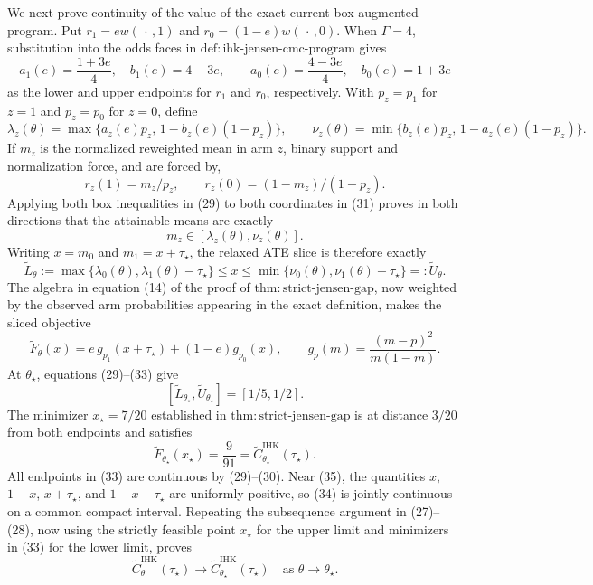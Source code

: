 We next prove continuity of the value of the exact current box-augmented program.  Put \(r_1=ew(\,\cdot\,,1)\) and \(r_0=(1-e)w(\,\cdot\,,0)\).  When \(\Gamma=4\), substitution into the odds faces in \(\mathrm{def{:}ihk\mbox{-}jensen\mbox{-}cmc\mbox{-}program}\) gives
\[
a_1(e)=\frac{1+3e}{4},\quad b_1(e)=4-3e,
\qquad
a_0(e)=\frac{4-3e}{4},\quad b_0(e)=1+3e
\tag{29}
\]
as the lower and upper endpoints for \(r_1\) and \(r_0\), respectively.  With \(p_z=p_1\) for \(z=1\) and \(p_z=p_0\) for \(z=0\), define
\[
\lambda_z(\theta)
=\max\{a_z(e)p_z,\,1-b_z(e)(1-p_z)\},
\qquad
\nu_z(\theta)
=\min\{b_z(e)p_z,\,1-a_z(e)(1-p_z)\}.
\tag{30}
\]
If \(m_z\) is the normalized reweighted mean in arm \(z\), binary support and normalization force, and are forced by,
\[
r_z(1)=m_z/p_z,
\qquad r_z(0)=(1-m_z)/(1-p_z).
\tag{31}
\]
Applying both box inequalities in (29) to both coordinates in (31) proves in both directions that the attainable means are exactly
\[
m_z\in[\lambda_z(\theta),\nu_z(\theta)].
\tag{32}
\]
Writing \(x=m_0\) and \(m_1=x+\tau_\star\), the relaxed ATE slice is therefore exactly
\[
\widetilde L_\theta
:=\max\{\lambda_0(\theta),\lambda_1(\theta)-\tau_\star\}
\leq x\leq
\min\{\nu_0(\theta),\nu_1(\theta)-\tau_\star\}
=:\widetilde U_\theta.
\tag{33}
\]
The algebra in equation (14) of the proof of \(\mathrm{thm{:}strict\mbox{-}jensen\mbox{-}gap}\), now weighted by the observed arm probabilities appearing in the exact definition, makes the sliced objective
\[
\widetilde F_\theta(x)
=e\,g_{p_1}(x+\tau_\star)+(1-e)g_{p_0}(x),
\qquad
g_p(m)=\frac{(m-p)^2}{m(1-m)}.
\tag{34}
\]
At \(\theta_\star\), equations (29)--(33) give
\[
[\widetilde L_{\theta_\star},\widetilde U_{\theta_\star}]=[1/5,1/2].
\tag{35}
\]
The minimizer \(x_\star=7/20\) established in \(\mathrm{thm{:}strict\mbox{-}jensen\mbox{-}gap}\) is at distance \(3/20\) from both endpoints and satisfies
\[
\widetilde F_{\theta_\star}(x_\star)
=\frac9{91}
=\widetilde C^{\mathrm{IHK}}_{\theta_\star}(\tau_\star).
\tag{36}
\]
All endpoints in (33) are continuous by (29)--(30).  Near (35), the quantities \(x\), \(1-x\), \(x+\tau_\star\), and \(1-x-\tau_\star\) are uniformly positive, so (34) is jointly continuous on a common compact interval.  Repeating the subsequence argument in (27)--(28), now using the strictly feasible point \(x_\star\) for the upper limit and minimizers in (33) for the lower limit, proves
\[
\widetilde C^{\mathrm{IHK}}_\theta(\tau_\star)
\longrightarrow
\widetilde C^{\mathrm{IHK}}_{\theta_\star}(\tau_\star)
\quad\text{as }\theta\to\theta_\star.
\tag{37}
\]

